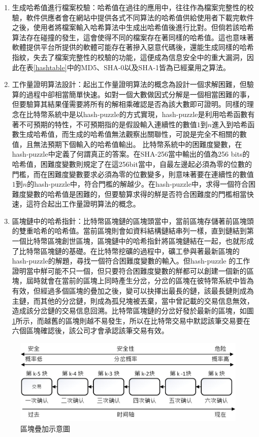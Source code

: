 				\begin{enumerate}
				\item 生成哈希值進行檔案校驗：哈希值在過往的應用中，往往作為檔案完整性的校驗，軟件供應者會在網站中提供各式不同算法的哈希值供給使用者下載完軟件之後，使用者將檔案輸入哈希算法中生成出哈希值後進行比對。但倘若該哈希算法存在碰撞的發生，這會使得不同的檔案存在著同樣的哈希值。這也意味著軟體提供平台所提供的軟體可能存在著摻入惡意代碼後，還能生成同樣的哈希指紋，失去了檔案完整性的校驗的功能，這便成為信息安全中的重大漏洞，因此在表\ref{hashtable}中的MD5、SHA-0以及SHA-1皆為已經棄用之算法。
				\item 工作量證明算法設計：起出工作量證明算法的概念為設計一個求解困難，但驗算的過程中卻相當簡單快速。如對一個大數做因式分解是一個相當困難的事，但要驗算其結果僅需要將所有的解相乘確認是否為該大數即可證明。同樣的理念在比特幣系統中是以hash-puzzle的方式實現，hash-puzzle是利用哈希函數有著不可預期的特性，不可預期指的是假設輸入連續性的數值$1$到$n$進入到哈希函數生成哈希值，而生成的哈希值無法觀察出關聯性，可說是完全不相關的數值，且無法預期下個輸入的哈希值輸出。
				比特幣系統中的困難度變數，在hash-puzzle中定義了何謂真正的答案。在SHA-256當中輸出的值為256 bits的哈希值，困難度變數則規定了在這256bit當中，自最左邊起必須為零的位數的門檻，而在困難度變數要求必須為零的位數變多，則意味著要在連續性的數值$1$到$n$的hash-puzzle中，符合門檻的解越少。在hash-puzzle中，求得一個符合困難度變數的哈希值是困難的，但要驗算求得的觧是否符合困難度的門檻相當快速，這符合起出工作量證明算法的概念。
				\item 區塊鏈中的哈希指針：比特幣區塊鏈的區塊頭當中，當前區塊存儲著前區塊頭的雙重哈希的哈希值。當前區塊則會如資料結構鏈結串列一樣，直到鏈結到第一個比特幣區塊創世區塊，區塊鏈中的哈希指針將區塊鏈結在一起，也就形成了比特幣區塊鏈的基礎。在比特幣挖礦的過程中，礦工參與著最新區塊的hash-puzzle的解題，尋找一個符合困難度變數的輸入。但hash-puzzle 的工作證明當中觧可能不只一個，但只要符合困難度變數的觧都可以創建一個新的區塊，屆時就會在當前的區塊上同時產生分岔，分岔的區塊在彼特幣系統中皆為有效，但經過多個區塊的疊加之後，變可以抉擇出最長的鏈，該最長鏈則成為主鏈，而其他的分岔鏈，則成為孤兒塊被丟棄，當中曾記載的交易信息無效，造成該分岔鏈的交易信息回溯。比特幣區塊鏈的分岔好發於最新的區塊，如圖\ref{6confirm}所示，而越舊的區塊則越不易發生，所以在比特幣交易中默認該筆交易要在六個區塊確認後，該公司才會承認該筆交易有效。
				\end{enumerate}

				\begin{figure}[htbp]
					\centering
					\includegraphics[width = 1\textwidth]{6confirm.jpg}
					\caption{區塊疊加示意圖}\label{6confirm}
				\end{figure}

